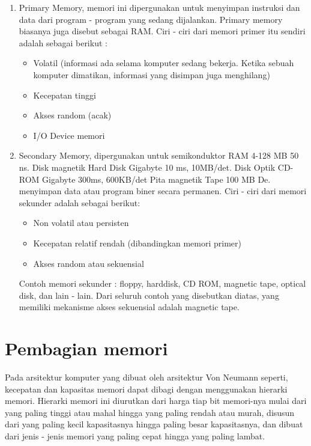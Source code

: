\begin{enumerate}

\item Primary Memory, memori ini dipergunakan untuk menyimpan instruksi dan data dari program - program yang sedang dijalankan. Primary memory biasanya juga 
disebut sebagai RAM. Ciri - ciri dari memori primer itu sendiri adalah sebagai berikut :  

\begin{itemize}


\item Volatil (informasi ada selama komputer sedang bekerja. Ketika sebuah komputer dimatikan, informasi yang disimpan juga menghilang)  
\item Kecepatan tinggi  
\item Akses random (acak)  
\item I/O Device memori

\end{itemize}

\item Secondary Memory, dipergunakan untuk semikonduktor RAM 4-128 MB 50 ns. Disk magnetik Hard Disk Gigabyte 10 ms, 10MB/det. Disk Optik CD-ROM Gigabyte 300ms, 600KB/det Pita magnetik Tape 100 MB De. menyimpan data atau program biner secara permanen. Ciri - ciri dari memori sekunder adalah sebagai berikut:  

\begin{itemize}

\item Non volatil atau persisten  
\item Kecepatan relatif rendah (dibandingkan memori primer)  
\item Akses random atau sekuensial  

\end{itemize}

Contoh memori sekunder : floppy, harddisk, CD ROM, magnetic tape, optical disk, dan lain - lain. Dari seluruh contoh yang disebutkan diatas, yang memiliki mekanisme akses sekuensial adalah magnetic tape. \cite{dwi2010pengantar}

\end{enumerate}

\section {Pembagian memori}
Pada arsitektur komputer yang dibuat oleh arsitektur Von Neumann seperti, kecepatan dan kapasitas memori dapat dibagi dengan menggunakan hierarki memori. Hierarki memori ini diurutkan dari harga tiap bit memori-nya mulai dari yang paling tinggi atau mahal hingga yang paling rendah atau murah, disusun dari yang paling kecil kapasitasnya hingga paling besar kapasitasnya, dan dibuat dari jenis - jenis memori yang paling cepat hingga yang paling lambat.

